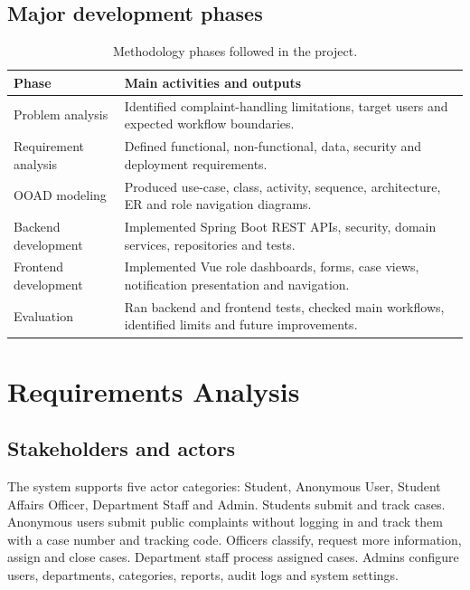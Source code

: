 \documentclass[11pt,a4paper]{article}
\begin{document}
\subsection{Major development phases}
\begin{table}[H]
\centering
\small
\begin{tabularx}{\textwidth}{p{}Y}
\toprule
Phase & Main activities and outputs\\
\midrule
Problem analysis & Identified complaint-handling limitations, target users and expected workflow boundaries.\\
Requirement analysis & Defined functional, non-functional, data, security and deployment requirements.\\
OOAD modeling & Produced use-case, class, activity, sequence, architecture, ER and role navigation diagrams.\\
Backend development & Implemented Spring Boot REST APIs, security, domain services, repositories and tests.\\
Frontend development & Implemented Vue role dashboards, forms, case views, notification presentation and navigation.\\
Evaluation & Ran backend and frontend tests, checked main workflows, identified limits and future improvements.\\
\bottomrule
\end{tabularx}
\caption{Methodology phases followed in the project.}
\end{table}

\section{Requirements Analysis}

\subsection{Stakeholders and actors}
The system supports five actor categories: Student, Anonymous User, Student Affairs Officer, Department Staff and Admin. Students submit and track cases. Anonymous users submit public complaints without logging in and track them with a case number and tracking code. Officers classify, request more information, assign and close cases. Department staff process assigned cases. Admins configure users, departments, categories, reports, audit logs and system settings.
\end{document}

